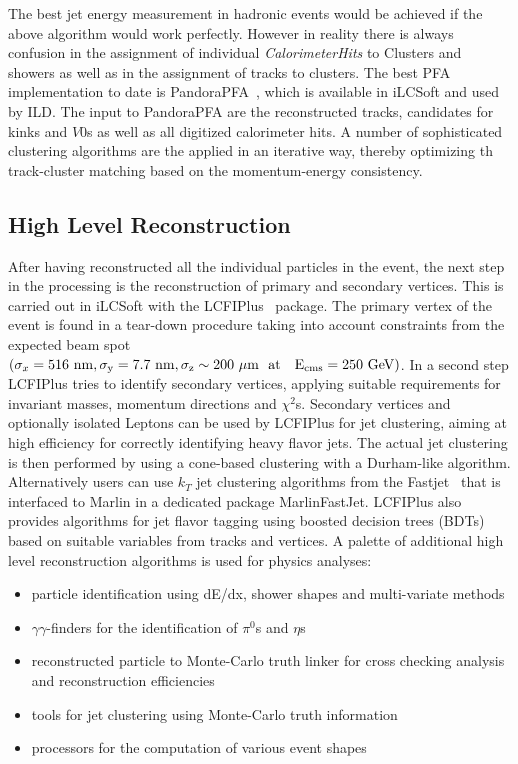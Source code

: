  The best jet energy measurement in hadronic events would be achieved if the above algorithm would work perfectly. However in reality
 there is always confusion in the assignment of individual \emph{CalorimeterHits} to Clusters and showers as well as in the assignment
 of tracks to clusters. The best PFA implementation to date is PandoraPFA~\cite{Marshall:2015rfa}, which is available in iLCSoft and used
 by ILD. The input to PandoraPFA are the reconstructed tracks, candidates for  kinks and  $V0$s as well as all digitized calorimeter hits.
 A number of sophisticated clustering algorithms are the applied in an iterative way, thereby optimizing th track-cluster matching
 based on the momentum-energy consistency.

\subsection{High Level Reconstruction}

After having reconstructed all the individual particles in the event, the next step in the processing is the reconstruction of
primary and secondary vertices. This is carried out in iLCSoft with the LCFIPlus~\cite{Suehara:2015ura} package.
The primary vertex of the event is found in a tear-down procedure taking into account constraints from the expected beam spot
$(\sigma_x=516~\rm{nm}, \sigma_y=7.7~\rm{nm},\sigma_z \sim 200~\mu\rm{m}~~\rm{at}~~~E_{cms}=250~\rm{GeV})$.
In a second step LCFIPlus tries to identify secondary vertices, applying suitable requirements for invariant masses, momentum directions
and $\chi^2$s. Secondary vertices and optionally isolated Leptons can be used by LCFIPlus for jet clustering, aiming at high efficiency for correctly
identifying heavy flavor jets. The actual jet clustering is then performed by using a cone-based clustering with a Durham-like algorithm.
Alternatively users can use $k_T$ jet clustering algorithms from the Fastjet~\cite{Cacciari:2006sm} that is interfaced to Marlin in a dedicated
package MarlinFastJet. LCFIPlus also provides algorithms for jet flavor tagging using boosted decision trees (BDTs) based on suitable
variables from tracks and vertices. A palette of additional high level reconstruction algorithms is used for physics analyses:
\begin{itemize}
\item particle identification using dE/dx, shower shapes and multi-variate methods
\item $\gamma\gamma$-finders for the identification of $\pi^0$s and $\eta$s
\item reconstructed particle to Monte-Carlo truth linker for cross checking analysis and reconstruction efficiencies
\item tools for jet clustering using Monte-Carlo truth information
\item processors for the computation of various event shapes
\end{itemize}



